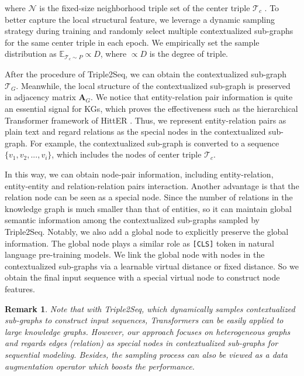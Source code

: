 \documentclass[sigconf]{acmart}
\newtheorem{remark}{\noindent \textbf{Remark}}
\newcommand{\bizhen}[1]{{\color{black}#1}}
\begin{document}
where $\mathcal{N}$ is the fixed-size neighborhood triple set of the center triple \bizhen{ $\mathcal{T}_c$ }.
To better capture the local structural feature, we leverage \bizhen{a dynamic sampling strategy} during training and randomly select multiple contextualized sub-graphs for the same center triple in each \bizhen{epoch}.
We empirically set the sample distribution as $\mathbb{E}_{\mathcal{T}_c \sim P} \propto D$, where $\propto D$ is the degree of triple.

After the procedure of Triple2Seq, we can obtain the contextualized sub-graph $\mathcal{T}_G$.
Meanwhile, the local structure of the contextualized sub-graph is preserved in adjacency matrix $\mathbf{A}_{G}$.
We notice that entity-relation pair information is quite an essential signal for KGs, which proves the effectiveness such as the hierarchical Transformer framework of HittER \cite{HittER}.
Thus, we represent entity-relation pairs as plain text and regard relations as the special nodes in the contextualized sub-graph.
For example, the contextualized sub-graph is converted to a \bizhen{sequence} $ \{ v_1, v_2, ..., v_i \} $, which includes the nodes of center triple \bizhen{$\mathcal{T}_c$}.

In this way, we can obtain node-pair information, including entity-relation, entity-entity and relation-relation pairs interaction.
Another advantage is that the relation node can be seen as a special node.
Since the number of relations in the knowledge graph is much smaller than that of entities, so it can maintain global semantic information among the contextualized sub-graphs sampled by Triple2Seq.
Notably, we also add a \bizhen{global node} to explicitly preserve the global information.
The global node plays a similar role as \texttt{[CLS]} token in natural language pre-training models.
We link the global node with nodes in the contextualized sub-graphs via a learnable virtual distance or fixed distance.
So we obtain the final input sequence with a special virtual node to construct node features.

\begin{remark}
Note that with Triple2Seq, which dynamically samples contextualized sub-graphs to construct input sequences, Transformers can be easily applied to large knowledge graphs.
However, our approach focuses on heterogeneous graphs and regards edges (relation) as special nodes in contextualized sub-graphs for sequential modeling.
Besides, the sampling process can also be viewed as a data augmentation operator  which boosts the performance.
\end{remark}
\end{document}
